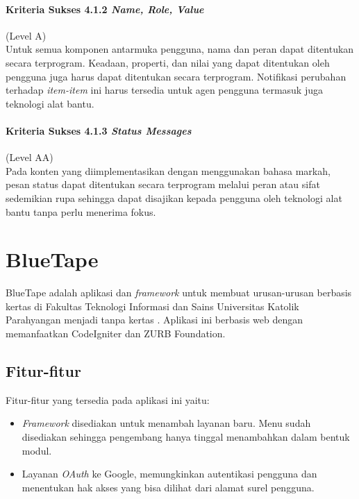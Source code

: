 \paragraph{Kriteria Sukses 4.1.2 \textit{Name, Role, Value}}
\label{sec:kriteria_sukses_4.1.2}
(Level A)\\

Untuk semua komponen antarmuka pengguna, nama dan peran dapat ditentukan secara terprogram. Keadaan, properti, dan nilai yang dapat ditentukan oleh pengguna juga harus dapat ditentukan secara terprogram. Notifikasi perubahan terhadap \textit{item-item} ini harus tersedia untuk agen pengguna termasuk juga teknologi alat bantu.

\paragraph{Kriteria Sukses 4.1.3 \textit{Status Messages}}
\label{sec:kriteria_sukses_4.1.3}
(Level AA)\\

Pada konten yang diimplementasikan dengan menggunakan bahasa markah, pesan status dapat ditentukan secara terprogram melalui peran atau sifat sedemikian rupa sehingga dapat disajikan kepada pengguna oleh teknologi alat bantu tanpa perlu menerima fokus.



\section{BlueTape}
\label{sec:bluetape}
BlueTape adalah aplikasi dan \textit{framework} untuk membuat urusan-urusan berbasis kertas di Fakultas Teknologi Informasi dan Sains Universitas Katolik Parahyangan menjadi tanpa kertas \cite{BlueTape}. Aplikasi ini berbasis web dengan memanfaatkan CodeIgniter dan ZURB Foundation.

\subsection{Fitur-fitur}
\label{sec:bluetape_fitur}
Fitur-fitur yang tersedia pada aplikasi ini yaitu:
\begin{itemize}
	\item \textit{Framework} disediakan untuk menambah layanan baru. Menu sudah disediakan sehingga pengembang hanya tinggal menambahkan dalam bentuk modul.
	\item Layanan \textit{OAuth} ke Google, memungkinkan autentikasi pengguna dan menentukan hak akses yang bisa dilihat dari alamat surel pengguna.
\end{itemize}

